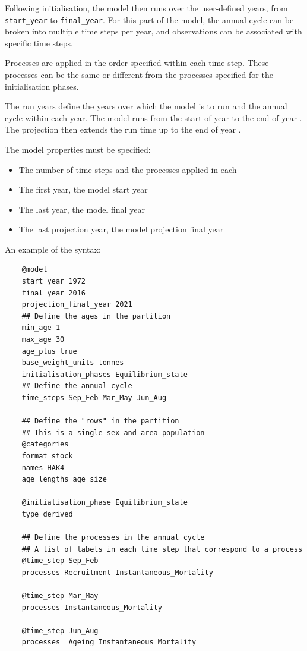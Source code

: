 \subsubsection{}

Following initialisation, the model then runs over the user-defined years, from \texttt{start\_year} to \texttt{final\_year}. For this part of the model, the annual cycle can be broken into multiple time steps per year, and observations can be associated with specific time steps.

Processes are applied in the order specified within each time step. These processes can be the same or different from the processes specified for the initialisation phases.

The run years define the years over which the model is to run and the annual cycle within each year. The model runs from the start of year  to the end of year . The projection then extends the run time up to the end of year .

The model properties must be specified:

\begin{itemize}
  \item The number of time steps and the processes applied in each
  \item The first year, the model start year
  \item The last year, the model final year
  \item The last projection year, the model projection final year
\end{itemize}

An example of the syntax:

{\small{\begin{verbatim}
	@model
	start_year 1972
	final_year 2016
	projection_final_year 2021
	## Define the ages in the partition
	min_age 1
	max_age 30
	age_plus true
	base_weight_units tonnes
	initialisation_phases Equilibrium_state
	## Define the annual cycle
	time_steps Sep_Feb Mar_May Jun_Aug

	## Define the "rows" in the partition
	## This is a single sex and area population
	@categories
	format stock
	names HAK4
	age_lengths age_size

	@initialisation_phase Equilibrium_state
	type derived

	## Define the processes in the annual cycle
	## A list of labels in each time step that correspond to a process
	@time_step Sep_Feb
	processes Recruitment Instantaneous_Mortality

	@time_step Mar_May
	processes Instantaneous_Mortality

	@time_step Jun_Aug
	processes  Ageing Instantaneous_Mortality
\end{verbatim}}}


